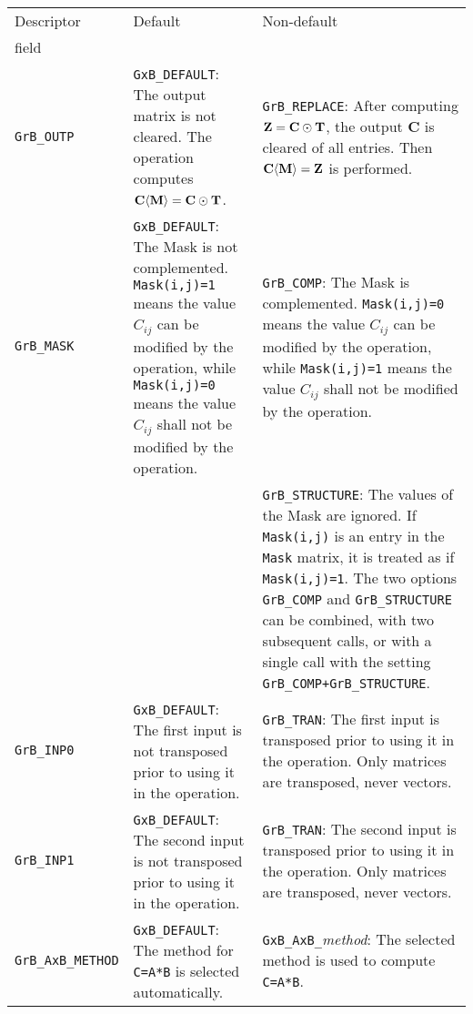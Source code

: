 \documentclass[12pt]{article}
\begin{document}
\vspace{0.2in}
\noindent
{\footnotesize
\begin{tabular}{|l|p{2.4in}|p{2.2in}|}
\hline
Descriptor & Default   & Non-default \\
field      & &  \\
\hline

\verb'GrB_OUTP'
    & \verb'GxB_DEFAULT':
    The output matrix is not cleared.  The operation computes
    ${\bf C \langle M \rangle = C \odot T}$.
    & \verb'GrB_REPLACE':
    After computing ${\bf Z=C\odot T}$,
    the output {\bf C} is cleared of all entries.
    Then ${\bf C \langle M \rangle = Z}$ is performed. \\

\hline

\verb'GrB_MASK'
    & \verb'GxB_DEFAULT':
    The Mask is not complemented.  \verb'Mask(i,j)=1' means the value $C_{ij}$
    can be modified by the operation, while \verb'Mask(i,j)=0' means the value
    $C_{ij}$ shall not be modified by the operation.
    & \verb'GrB_COMP':
    The Mask is complemented.  \verb'Mask(i,j)=0' means the value $C_{ij}$
    can be modified by the operation, while \verb'Mask(i,j)=1' means the value
    $C_{ij}$ shall not be modified by the operation. \\
    &
    & \verb'GrB_STRUCTURE':
    The values of the Mask are ignored.  If \verb'Mask(i,j)' is an entry
    in the \verb'Mask' matrix, it is treated as if \verb'Mask(i,j)=1'.
    The two options \verb'GrB_COMP' and \verb'GrB_STRUCTURE' can be
    combined, with two subsequent calls, or with a single call with the setting
    \verb'GrB_COMP+GrB_STRUCTURE'.  \\

\hline

\verb'GrB_INP0'
    & \verb'GxB_DEFAULT':
    The first input is not transposed prior to using it in the operation.
    & \verb'GrB_TRAN':
    The first input is transposed prior to using it in the operation.  Only
    matrices are transposed, never vectors. \\

\hline

\verb'GrB_INP1'
    & \verb'GxB_DEFAULT':
    The second input is not transposed prior to using it in the operation.
    & \verb'GrB_TRAN':
    The second input is transposed prior to using it in the operation.  Only
    matrices are transposed, never vectors. \\

\hline

\verb'GrB_AxB_METHOD'
    & \verb'GxB_DEFAULT':
    The method for \verb'C=A*B' is selected automatically.
    & \verb'GxB_AxB_'{\em method}: The selected method is used to compute
    \verb'C=A*B'.  \\

\hline
\end{tabular}
}
\end{document}
